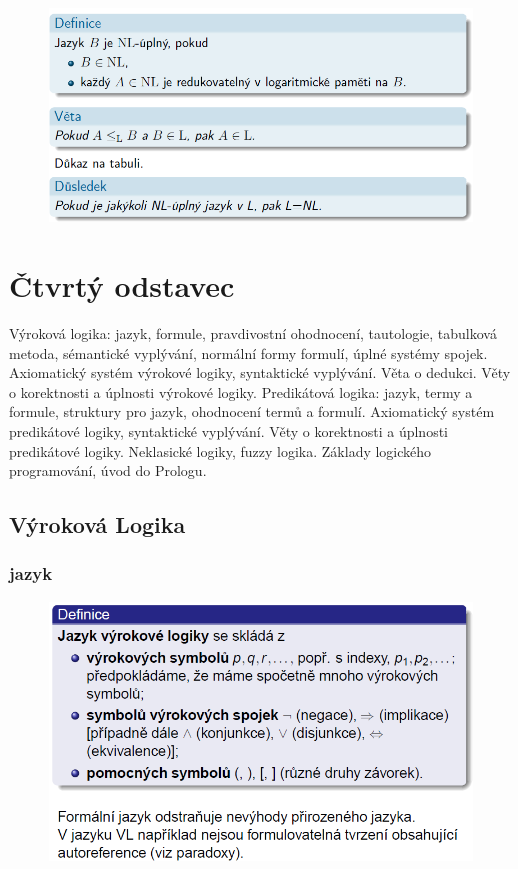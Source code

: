 \documentclass[10pt,a4paper]{article}
\theoremstyle{note}
\begin{document}
		\begin{figure}[!h]
		\centering
		\includegraphics[width=13cm]{img/NLuplny.png}
		\end{figure}



\section{Čtvrtý odstavec}

Výroková logika: jazyk, formule, pravdivostní ohodnocení, tautologie, tabulková metoda, sémantické vyplývání,
normální formy formulí, úplné systémy spojek. Axiomatický systém výrokové logiky, syntaktické vyplývání. Věta
o dedukci. Věty o korektnosti a úplnosti výrokové logiky. Predikátová logika: jazyk, termy a formule, struktury
pro jazyk, ohodnocení termů a formulí. Axiomatický systém predikátové logiky, syntaktické vyplývání. Věty o
korektnosti a úplnosti predikátové logiky. Neklasické logiky, fuzzy logika. Základy logického programování, úvod
do Prologu.


	\subsection{Výroková Logika}

		\subsubsection{jazyk}
			\begin{figure}[!h]
			\centering
			\includegraphics[width=13cm]{img/jazykVL.png}
			\end{figure}
\end{document}
